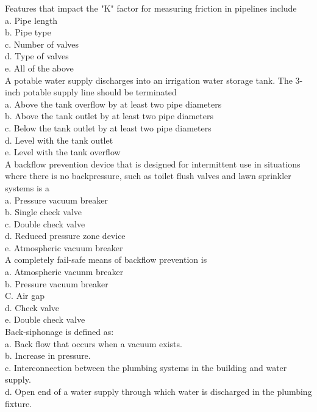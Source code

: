 Features that impact the "K" factor for measuring friction in pipelines include\\
a. Pipe length\\
b. Pipe type\\
c. Number of valves\\
d. Type of valves\\
e. All of the above\\

A potable water supply discharges into an irrigation water storage tank. The 3-inch potable supply line should be terminated\\
a. Above the tank overflow by at least two pipe diameters\\
b. Above the tank outlet by at least two pipe diameters\\
c. Below the tank outlet by at least two pipe diameters\\
d. Level with the tank outlet\\
e. Level with the tank overflow\\

A backflow prevention device that is designed for intermittent use in situations where there is no backpressure, such as toilet flush valves and lawn sprinkler systems is a\\
a. Pressure vacuum breaker\\
b. Single check valve\\
c. Double check valve\\
d. Reduced pressure zone device\\
e. Atmospheric vacuum breaker\\

A completely fail-safe means of backflow prevention is\\
a. Atmospheric vacunm breaker\\
b. Pressure vacuum breaker\\
C. Air gap\\
d. Check valve\\
e. Double check valve\\

Back-siphonage is defined as:\\
a. Back flow that occurs when a vacuum exists.\\
b. Increase in pressure.\\
c. Interconnection between the plumbing systems in the building and water supply.\\
d. Open end of a water supply through which water is discharged in the plumbing fixture.\\

